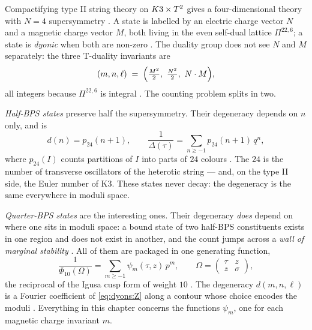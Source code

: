 Compactifying type II string theory on $K3\times T^2$ gives a four-dimensional theory with $N=4$
supersymmetry . A state is labelled by an electric charge
vector $N$ and a magnetic charge vector $M$, both living in the even self-dual lattice
$\Pi^{22,6}$; a state is \emph{dyonic} when both are non-zero
. The duality group does not see $N$ and $M$ separately: the
three T-duality invariants are
\begin{equation}\label{eq:dyons:invariants}
  (m,n,\ell)\;=\;\Bigl(\tfrac{M^2}{2},\ \tfrac{N^2}{2},\ N\cdot M\Bigr),
\end{equation}
all integers because $\Pi^{22,6}$ is integral . The counting
problem splits in two.

\emph{Half-BPS states} preserve half the supersymmetry. Their degeneracy depends on $n$ only,
and is
\begin{equation}\label{eq:dyons:halfbps}
  d(n)=p_{24}(n+1),\qquad \frac{1}{\Delta(\tau)}=\sum_{n\ge-1}p_{24}(n+1)\,q^{n},
\end{equation}
where $p_{24}(I)$ counts partitions of $I$ into
parts of $24$ colours . The $24$ is the number of transverse
oscillators of the heterotic string --- and, on the type II side, the Euler number of K3. These
states never decay: the degeneracy is the same everywhere in moduli space.

\emph{Quarter-BPS states} are the interesting ones. Their degeneracy \emph{does} depend on
where one sits in moduli space: a bound state of two half-BPS constituents exists in one
region and does not exist in another, and the count jumps across a \emph{wall of marginal
stability} . All of them are
packaged in one generating function,
\begin{equation}\label{eq:dyons:Z}
  \frac{1}{\Phi_{10}(\Omega)}=\sum_{m\ge-1}\psi_m(\tau,z)\,p^{m},
  \qquad
  \Omega=\begin{pmatrix}\tau&z\\ z&\sigma\end{pmatrix},
\end{equation}
the reciprocal of the Igusa cusp form of weight $10$ . The
degeneracy $d(m,n,\ell)$ is a Fourier coefficient of \eqref{eq:dyons:Z} along a contour whose
choice encodes the moduli . Everything in this chapter concerns
the functions $\psi_m$, one for each magnetic charge invariant $m$.

